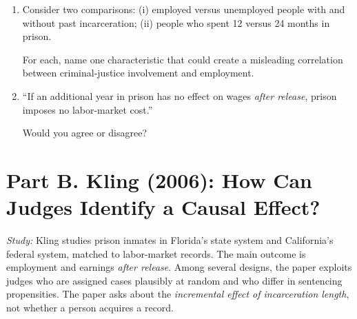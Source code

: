 \documentclass[11pt]{article}
\newif\ifinstructor
\newcommand{\answer}[1]{%
\ifinstructor
\par\smallskip\noindent
{\color{blue!55!black}\small
\textbf{Suggested answer:} #1}
\par
\fi
}
\begin{document}
\begin{enumerate}

\item Consider two comparisons:
(i) employed versus unemployed people with and without past incarceration;
(ii) people who spent 12 versus 24 months in prison.

For each, name one characteristic that could create a misleading
correlation between criminal-justice involvement and employment.

\answer{
The first comparison suffers from selection into arrest, conviction,
and prison (e.g., prior work history or offense severity).
In the second, longer sentences may reflect more serious offenses,
prior records, and weaker labor-market attachment.
Neither raw difference isolates the treatment effect.
}
\vspace{3cm}

\item ``If an additional year in prison has no effect on wages
\emph{after release}, prison imposes no labor-market cost.''

Would you agree or disagree?

\answer{
No. Post-release wage effects of extra months do not measure
income foregone during confinement or the effect of acquiring
a record. The counterfactuals differ: an additional month for
someone already sentenced versus having a record rather than
no record; neither implies zero total costs of incarceration.
}
\vspace{3cm}

\end{enumerate}

\section*{Part B. Kling (2006): How Can Judges Identify a Causal Effect?}

\noindent\textit{Study:}
Kling studies prison inmates in Florida's state system
and California's federal system, matched to labor-market records.
The main outcome is employment and earnings \emph{after release}.
Among several designs, the paper exploits judges who are assigned
cases plausibly at random and who differ in sentencing propensities.
The paper asks about the \emph{incremental effect of incarceration
length}, not whether a person acquires a record.
\end{document}
